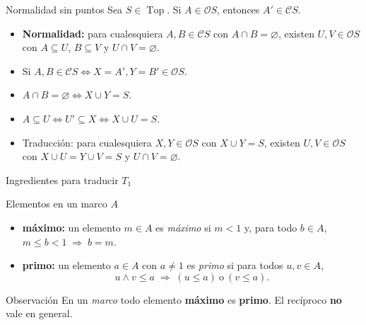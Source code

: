 \documentclass[compress,12pt]{beamer}
\DeclareMathOperator{\Top}{Top}
\begin{document}
\begin{frame}{Normalidad sin puntos}
Sea $S\in \Top$. Si $A\in \mathcal{O}S$, entonces $A'\in \mathcal{C}S$.
\begin{itemize}
\item<2-> \textbf{Normalidad:} para cualesquiera $A, B\in \mathcal{C}S$ con $A\cap B=\varnothing$, 
existen $U,V\in \mathcal{O}S$ con $A\subseteq U$, $B\subseteq V$ y $U\cap V=\varnothing$.

  \item<4-> Si $A,B\in \mathcal{C}S \iff X=A', Y=B'\in \mathcal{O}S$.
    \item<5-> $A\cap B=\varnothing \iff X\cup Y=S$.
    \item<6-> $A\subseteq U \iff U'\subseteq X\iff X\cup U=S$.
    \item<7-> \alert{Traducción:} para cualesquiera $X, Y\in \mathcal{O}S$ con $X\cup Y=S$, 
existen $U,V\in \mathcal{O}S$ con $X\cup U=Y\cup V=S$ y $U\cap V=\varnothing$. 
\end{itemize}
\end{frame}

\begin{frame}{Ingredientes para traducir $T_1$}

\begin{block}{Elementos en un marco $A$}
  \begin{itemize}
    \item<2-> \textbf{máximo:} un elemento $m\in A$ es \emph{máximo} si $m<1$ y,
    para todo $b\in A$, \; $m\le b<1 \;\Rightarrow\; b=m$.

    \item<3-> \textbf{primo:} un elemento $a\in A$ con $a\ne 1$ es
    \emph{primo} si para todos $u,v\in A$,
    \[
      u\wedge v \le a \;\Rightarrow\; (u\le a)\ \text{o}\ (v\le a).
    \]
  \end{itemize}
\end{block}

\begin{alertblock}{Observación}
En un \emph{marco} todo elemento \textbf{máximo} es
\textbf{primo}. El recíproco \textbf{no} vale en general.
\end{alertblock}

\end{frame}
\end{document}
